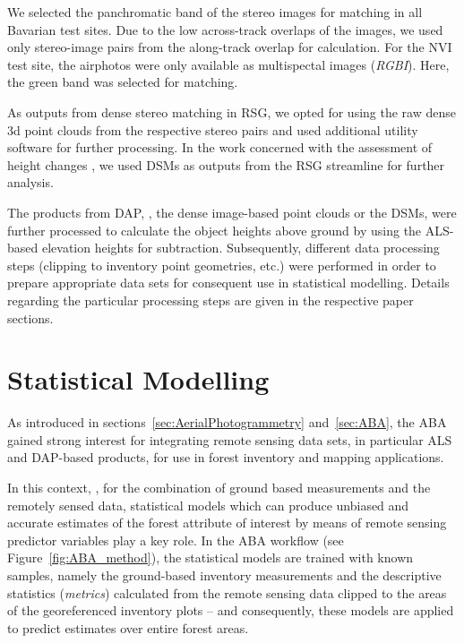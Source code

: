 We selected the panchromatic band 
of the stereo images for matching in all Bavarian test sites. Due to the low across-track overlaps of the images,
we used only stereo-image pairs from the along-track overlap for calculation.
For the \ac{NVI} test site, the airphotos were only available as multispectal images (\emph{RGBI}). Here, the green band was selected for matching.

As outputs from dense stereo matching in RSG, we opted for using the raw dense 3d point clouds from the respective stereo pairs and used additional utility software for 
further processing. In the work concerned with the assessment of height changes \parencite{Stepper.2015}, 
we used \acp{DSM} as outputs from the RSG streamline for further analysis.
  
The products from \ac{DAP}, \ie, the dense image-based point clouds or the \acp{DSM}, were further processed to calculate the object heights above ground 
by using the \ac{ALS}-based elevation heights for subtraction. 
Subsequently, different data processing steps (clipping to inventory point geometries, etc.) were performed in order to prepare appropriate data sets for 
consequent use in statistical modelling. Details regarding the particular processing steps are given in the respective paper sections.
 

\section{Statistical Modelling}\label{sec:StatModel}

As introduced in sections~\ref{sec:AerialPhotogrammetry} and~\ref{sec:ABA},
the \acf{ABA} gained strong interest for integrating remote sensing data sets, in particular \ac{ALS} and \ac{DAP}-based products,
for use in forest inventory and mapping applications.

In this context, \ie, for the combination of ground based measurements and the remotely sensed data, statistical models which can produce
unbiased and accurate estimates of the forest attribute of interest by means of remote sensing predictor variables
play a key role. 
In the \ac{ABA} workflow (see Figure~\ref{fig:ABA_method}), the statistical models are trained with known samples, 
namely the ground-based inventory measurements and the descriptive statistics (\mbox{\emph{metrics}}) calculated 
from the remote sensing data clipped to the areas of the georeferenced inventory plots --
and consequently, these models are applied to predict estimates over entire forest areas.

